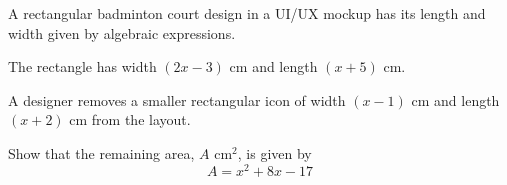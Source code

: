 \begin{question}
\noindent A rectangular badminton court design in a UI/UX mockup has its length and width given by algebraic expressions.

\noindent The rectangle has width $(2x - 3)$ cm and length $(x + 5)$ cm.

\noindent A designer removes a smaller rectangular icon of width $(x - 1)$ cm and length $(x + 2)$ cm from the layout.

\noindent Show that the remaining area, $A$ cm$^2$, is given by
\[
A = x^2 + 8x - 17
\]
\vspace{5cm}
\begin{flushright}
\end{flushright}
\end{question}
